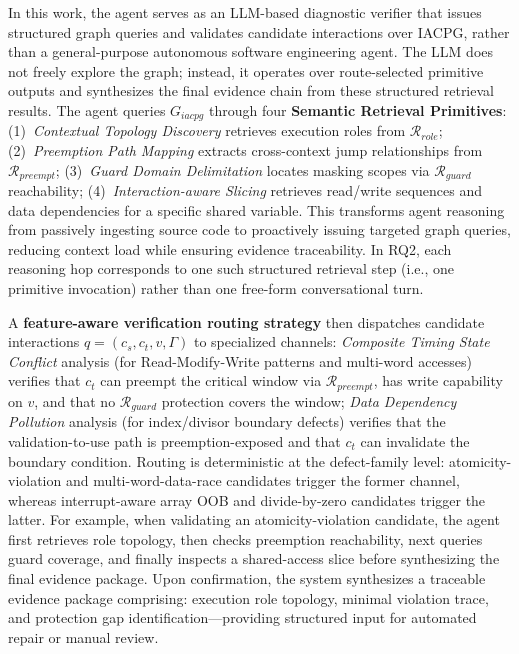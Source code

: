 \documentclass[a4paper,UKenglish,cleveref, autoref, thm-restate]{lipics-v2021}
\begin{document}
In this work, the agent serves as an LLM-based diagnostic verifier that issues structured graph queries and validates candidate interactions over IACPG, rather than a general-purpose autonomous software engineering agent. The LLM does not freely explore the graph; instead, it operates over route-selected primitive outputs and synthesizes the final evidence chain from these structured retrieval results.
The agent queries $G_{iacpg}$ through four \textbf{Semantic Retrieval Primitives}: (1)~\textit{Contextual Topology Discovery} retrieves execution roles from $\mathcal{R}_{role}$; (2)~\textit{Preemption Path Mapping} extracts cross-context jump relationships from $\mathcal{R}_{preempt}$; (3)~\textit{Guard Domain Delimitation} locates masking scopes via $\mathcal{R}_{guard}$ reachability; (4)~\textit{Interaction-aware Slicing} retrieves read/write sequences and data dependencies for a specific shared variable. This transforms agent reasoning from passively ingesting source code to proactively issuing targeted graph queries, reducing context load while ensuring evidence traceability. In RQ2, each reasoning hop corresponds to one such structured retrieval step (i.e., one primitive invocation) rather than one free-form conversational turn.

A \textbf{feature-aware verification routing strategy} then dispatches candidate interactions $q=(c_s,c_t,v,\Gamma)$ to specialized channels: \textit{Composite Timing State Conflict} analysis (for Read-Modify-Write patterns and multi-word accesses) verifies that $c_t$ can preempt the critical window via $\mathcal{R}_{preempt}$, has write capability on $v$, and that no $\mathcal{R}_{guard}$ protection covers the window; \textit{Data Dependency Pollution} analysis (for index/divisor boundary defects) verifies that the validation-to-use path is preemption-exposed and that $c_t$ can invalidate the boundary condition. Routing is deterministic at the defect-family level: atomicity-violation and multi-word-data-race candidates trigger the former channel, whereas interrupt-aware array OOB and divide-by-zero candidates trigger the latter. For example, when validating an atomicity-violation candidate, the agent first retrieves role topology, then checks preemption reachability, next queries guard coverage, and finally inspects a shared-access slice before synthesizing the final evidence package. Upon confirmation, the system synthesizes a traceable evidence package comprising: execution role topology, minimal violation trace, and protection gap identification---providing structured input for automated repair or manual review.
\end{document}
